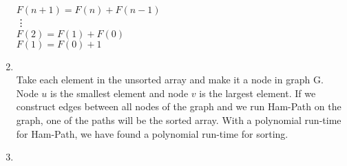 \documentclass[11pt]{article}
\begin{document}
\begin{enumerate}
            $F(n+1) = F(n) + F(n-1)$\\
            \vdots\\
            $F(2) = F(1) + F(0)$\\
            $F(1) = F(0) + 1$\\
            \item \\
            Take each element in the unsorted array and make it a node in graph G.  Node $u$ is the smallest
            element and node $v$ is the largest element.  If we construct edges between all nodes of the graph
            and we run Ham-Path on the graph, one of the paths will be the sorted array.  With a polynomial run-time
            for Ham-Path, we have found a polynomial run-time for sorting.
            \item \\
            
            \end{enumerate}

                                
\end{document}
